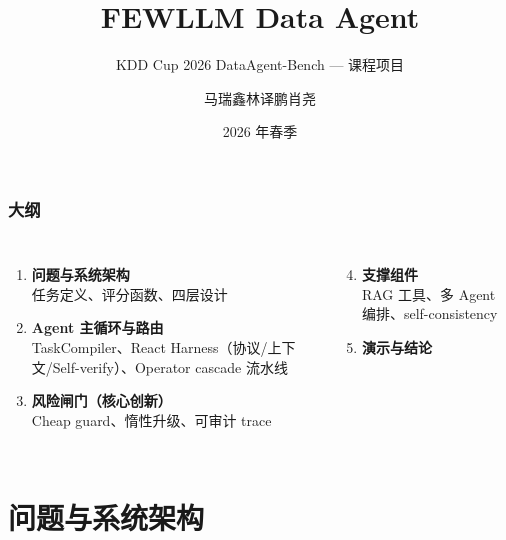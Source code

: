 \documentclass[11pt, aspectratio=169]{beamer}
\title[FEWLLM Data Agent]{FEWLLM Data Agent}
\subtitle{KDD Cup 2026 DataAgent-Bench --- 课程项目}
\author[团队]{马瑞鑫\quad 林译鹏\quad 肖尧}
\institute[港科大（广州）]{
信息枢纽\\[0.3em]
香港科技大学（广州）
}
\date[2026]{2026 年春季}
\begin{document}
\addtocounter{framenumber}{-1}
\frame{\titlepage}

\begin{frame}
\frametitle{大纲}
\begin{columns}[T]
\begin{enumerate}
    \item \textbf{问题与系统架构}\\{\small 任务定义、评分函数、四层设计}
    \item \textbf{Agent 主循环与路由}\\{\small TaskCompiler、React Harness（协议/上下文/Self-verify）、Operator cascade 流水线}
    \item \textbf{风险闸门（核心创新）}\\{\small Cheap guard、惰性升级、可审计 trace}
\end{enumerate}
\begin{enumerate}
    \setcounter{enumi}{3}
    \item \textbf{支撑组件}\\{\small RAG 工具、多 Agent 编排、self-consistency}
    \item \textbf{演示与结论}
\end{enumerate}
\end{columns}
\end{frame}

\section{问题与系统架构}
\end{document}
